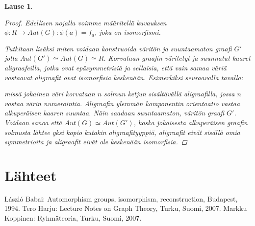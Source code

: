 \documentclass[a4paper, 12pt]{article}
\theoremstyle{definition}
\theoremstyle{plain}
\newtheorem{teor}[mydef]{Lause}
\begin{document}
\begin{teor}
\begin{proof}
Edellisen nojalla voimme määritellä kuvauksen $\phi: R \rightarrow Aut(G): \phi(a) = f_a$, joka on isomorfismi.



Tutkitaan lisäksi miten voidaan konstruoida väritön ja suuntaamaton graafi $G'$ jolla $Aut(G') \simeq Aut(G) \simeq R$. 
Korvataan graafin väritetyt ja suunnatut kaaret aligraafeilla, jotka ovat epäsymmetrisiä ja sellaisia, että vain samaa väriä vastaavat aligraafit ovat isomorfisia keskenään. Esimerkiksi seuraavalla tavalla:

\begin{center}
\end{center}
missä jokainen väri korvataan $n$ solmun ketjun sisältävällä aligraafilla, jossa $n$ vastaa värin numerointia. Aligraafin ylemmän komponentin orientaatio vastaa alkuperäisen kaaren suuntaa. Näin saadaan suuntaamaton, väritön graafi $G'$. Voidaan sanoa että $Aut(G) \simeq Aut(G')$, koska jokaisesta alkuperäisen graafin solmusta lähtee yksi kopio kutakin aligraafityyppiä, aligraafit eivät sisällä omia symmetrioita ja aligraafit eivät ole keskenään isomorfisia.
\end{proof}
\end{teor}


\section{Lähteet}
László Babai: Automorphism groups, isomorphism, reconstruction, Budapest, 1994.
Tero Harju: Lecture Notes on Graph Theory, Turku, Suomi, 2007.
Markku Koppinen: Ryhmäteoria, Turku, Suomi, 2007.
\end{document}
